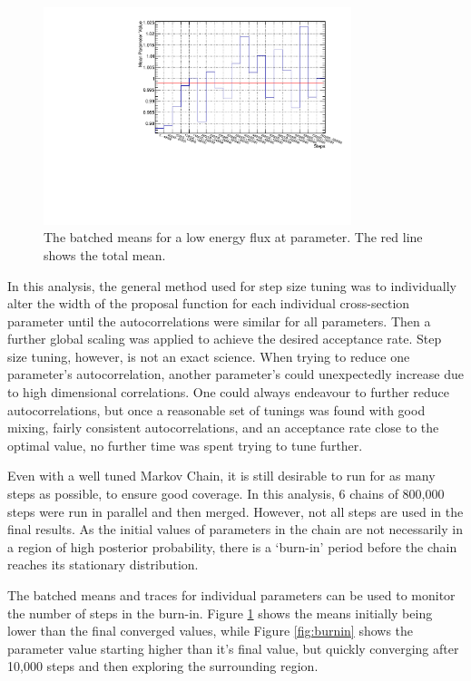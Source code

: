 \begin{figure}[!htbp]
\centering
\includegraphics*[width=0.8\textwidth,clip]{figs/batch}
\caption{The batched means for a low energy flux at parameter. The red line shows the total mean.}\label{fig:batch}
\end{figure}

In this analysis, the general method used for step size tuning was to individually alter the width of the proposal function for each individual cross-section parameter until the autocorrelations were similar for all parameters. Then a further global scaling was applied to achieve the desired acceptance rate. Step size tuning, however, is not an exact science. When trying to reduce one parameter's autocorrelation, another parameter's could unexpectedly increase due to high dimensional correlations. One could always endeavour to further reduce autocorrelations, but once a reasonable set of tunings was found with good mixing, fairly consistent autocorrelations, and an acceptance rate close to the optimal value, no further time was spent trying to tune further.

Even with a well tuned Markov Chain, it is still desirable to run for as many steps as possible, to ensure good coverage. In this analysis, 6 chains of 800,000 steps were run in parallel and then merged. However, not all steps are used in the final results. As the initial values of parameters in the chain are not necessarily in a region of high posterior probability, there is a `burn-in' period before the chain reaches its stationary distribution.

The batched means and traces for individual parameters can be used to monitor the number of steps in the burn-in. Figure \ref{fig:batch} shows the means initially being lower than the final converged values, while Figure \ref{fig:burnin} shows the parameter value starting higher than it's final value, but quickly converging after 10,000 steps and then exploring the surrounding region. 

